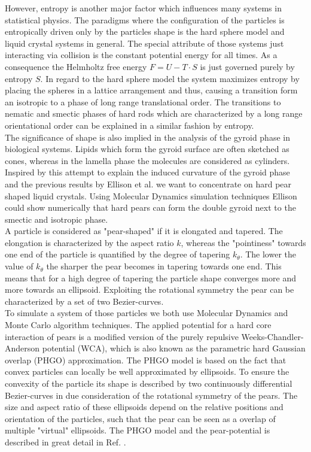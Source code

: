 \documentclass[epj,onecolumn]{webofc}
\begin{document}
However, entropy is another major factor which influences many systems in statistical physics. The paradigms where the configuration of the particles is entropically driven only by the particles shape is the hard sphere model 
and liquid crystal systems in general. The special attribute of those systems just interacting via collision is the constant potential energy for all times. As a consequence the Helmholtz free energy $F=U-T\cdot S$ is just governed 
purely by entropy $S$. In regard to the hard sphere model the system maximizes entropy by placing the spheres in a lattice arrangement and thus, causing a transition form an isotropic to a phase of long range translational 
order. The transitions to nematic and smectic phases of hard rods which are characterized by a long range orientational order can be explained in a similar fashion by entropy.\\

The significance of shape is also implied in the analysis of the gyroid phase in biological systems. Lipids which form the gyroid surface are often sketched as cones, whereas in the lamella phase the molecules are considered 
as cylinders. Inspired by this attempt to explain the induced curvature of the gyroid phase and the previous results by Ellison et al. \cite{} we want to concentrate on hard pear shaped liquid crystals. Using Molecular Dynamics 
simulation techniques Ellison could show numerically that hard pears can form the double gyroid next to the smectic and isotropic phase.\\

A particle is considered as "pear-shaped" if it is elongated and tapered. The elongation is characterized by the aspect ratio $k$, whereas the "pointiness" towards one end of the particle is quantified by the degree of tapering $k_{\theta}$. The lower the value of 
$k_{\theta}$ the sharper the pear becomes in tapering towards one end. This means that for a high degree of tapering the particle shape converges more and more towards an ellipsoid. Exploiting the rotational symmetry the 
pear can be characterized by a set of two Bezier-curves.\\

To simulate a system of those particles we both use Molecular Dynamics and Monte Carlo algorithm techniques. The applied potential for a hard core interaction of pears is a modified version of the purely repulsive 
Weeks-Chandler-Anderson potential (WCA), which is also known as the parametric hard Gaussian overlap (PHGO) approximation. The PHGO model is based on the fact that convex particles can locally be well approximated by 
ellipsoids. To ensure the convexity of the particle its shape is described by two continuously differential Bezier-curves in due consideration of the rotational symmetry of the pears. The size and aspect ratio of these ellipsoids depend on the relative positions and orientation of the particles, such that the pear can be seen as a overlap of multiple "virtual" ellipsoids. The PHGO model and the pear-potential is described in great detail in Ref. \cite{}.\\
\end{document}
